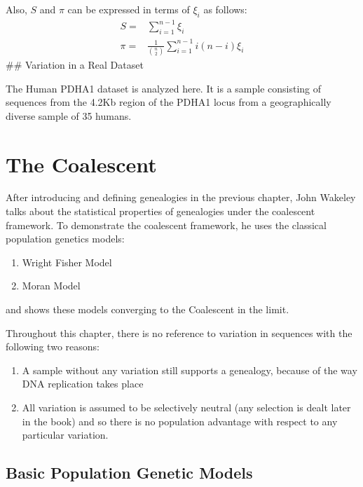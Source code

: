 \documentclass[
]{book}
\providecommand{\tightlist}{%
  \setlength{\itemsep}{0pt}\setlength{\parskip}{0pt}}
\theoremstyle{definition}
\theoremstyle{definition}
\theoremstyle{definition}
\theoremstyle{definition}
\theoremstyle{remark}
\begin{document}
Also, \(S\) and \(\pi\) can be expressed in terms of \(\xi_i\) as follows:
\[\begin{align*} S =& \sum_{i=1}^{n-1}\xi_i \\ \pi =& \frac{1}{{n \choose 2}}\sum_{i=1}^{n-1}i(n-i)\xi_i \end{align*}\]
\#\# Variation in a Real Dataset

The Human PDHA1 dataset is analyzed here. It is a sample consisting of sequences from the 4.2Kb region of the PDHA1 locus from a geographically diverse sample of 35 humans.

\hypertarget{the-coalescent}{%
\chapter{The Coalescent}\label{the-coalescent}}

After introducing and defining genealogies in the previous chapter, John Wakeley talks about the statistical properties of genealogies under the coalescent framework. To demonstrate the coalescent framework, he uses the classical population genetics models:

\begin{enumerate}
\def\labelenumi{\alph{enumi}.}
\tightlist
\item
  Wright Fisher Model
\item
  Moran Model
\end{enumerate}

and shows these models converging to the Coalescent in the limit.

Throughout this chapter, there is no reference to variation in sequences with the following two reasons:

\begin{enumerate}
\def\labelenumi{\arabic{enumi}.}
\item
  A sample without any variation still supports a genealogy, because of the way DNA replication takes place
\item
  All variation is assumed to be selectively neutral (any selection is dealt later in the book) and so there is no population advantage with respect to any particular variation.
\end{enumerate}

\hypertarget{basic-population-genetic-models}{%
\section{Basic Population Genetic Models}\label{basic-population-genetic-models}}
\end{document}
